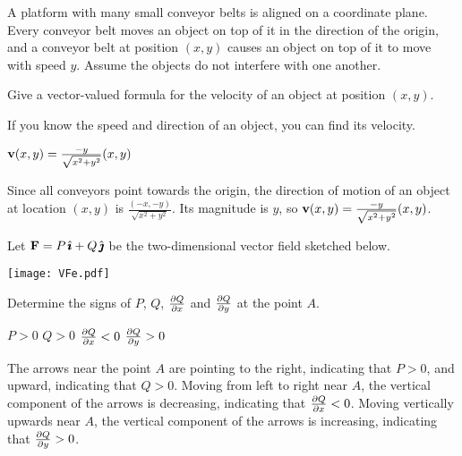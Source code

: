 \begin{question}
A platform with many small conveyor belts is aligned on a coordinate plane. Every conveyor belt moves an object on top of it in the direction of the origin, and a conveyor belt at position $(x,y)$ causes an object on top of it to move with speed $y$. Assume the objects do not interfere with one another.

 Give a vector-valued formula for the velocity of an object at position $(x,y)$.
 \end{question}

\begin{hint} 
If you know the speed and direction of an object, you can find its velocity.
\end{hint}

\begin{answer} 
$\mathbf{v}(x,y)=\frac{-y}{\sqrt{x^2+y^2}}(x,y)$
\end{answer}

\begin{solution}

\item  Since all conveyors point towards the origin, the direction of motion of an object at location $(x,y)$ is $\frac{(-x,-y)}{\sqrt{x^2+y^2}}$. Its magnitude is $y$, so $\mathbf{v}(x,y)=\frac{-y}{\sqrt{x^2+y^2}}(x,y)$.
\end{solution}

\begin{question}
Let $\mathbf{F} = P\,\hat{\pmb{\imath}} + Q\,\hat{\pmb{\jmath}}$ be the two-dimensional vector field sketched below.
\begin{center}
      \texttt{[image: VFe.pdf]}
\end{center}
 Determine the signs of $P$, $Q$, $\pdiff{Q}{x}$
and $\pdiff{Q}{y}$ at the point $A$.
\end{question}

\begin{hint} 
\end{hint}

\begin{answer} 
$P>0$\qquad
$Q>0$\qquad
$\pdiff{Q}{x}<0$\qquad
$\pdiff{Q}{y}>0$
\end{answer}

\begin{solution}
The arrows near the point $A$ are pointing to the
right, indicating that $P>0$, and upward, indicating
that $Q>0$. Moving from left to right near $A$, the
vertical component of the arrows is decreasing, indicating that 
$\pdiff{Q}{x}<0$.  Moving vertically
upwards near $A$, the vertical component of the arrows is 
increasing, indicating that $\pdiff{Q}{y}>0$.

\end{solution}

